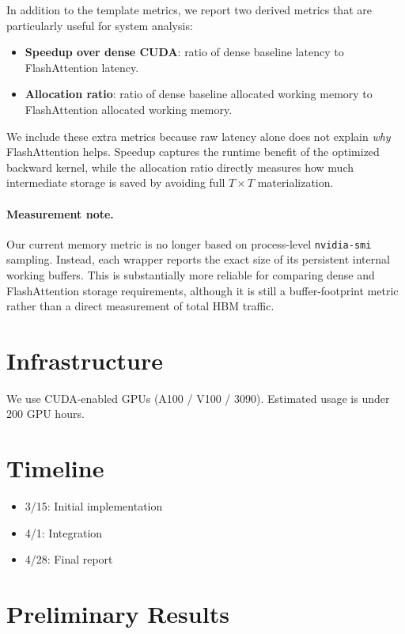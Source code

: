 \documentclass{article}
\begin{document}
In addition to the template metrics, we report two derived metrics that are particularly useful for system analysis:
\begin{itemize}
    \item \textbf{Speedup over dense CUDA}: ratio of dense baseline latency to FlashAttention latency.
    \item \textbf{Allocation ratio}: ratio of dense baseline allocated working memory to FlashAttention allocated working memory.
\end{itemize}

We include these extra metrics because raw latency alone does not explain \emph{why} FlashAttention helps. Speedup captures the runtime benefit of the optimized backward kernel, while the allocation ratio directly measures how much intermediate storage is saved by avoiding full $T \times T$ materialization.

\paragraph{Measurement note.} Our current memory metric is no longer based on process-level \texttt{nvidia-smi} sampling. Instead, each wrapper reports the exact size of its persistent internal working buffers. This is substantially more reliable for comparing dense and FlashAttention storage requirements, although it is still a buffer-footprint metric rather than a direct measurement of total HBM traffic.

\section{Infrastructure}

We use CUDA-enabled GPUs (A100 / V100 / 3090). Estimated usage is under 200 GPU hours.

\section{Timeline}

\begin{itemize}
    \item 3/15: Initial implementation
    \item 4/1: Integration
    \item 4/28: Final report
\end{itemize}

\section{Preliminary Results}
\end{document}
